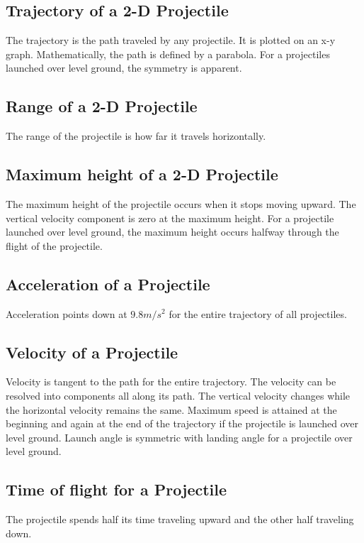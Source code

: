 \subsection{Trajectory of a 2-D Projectile}
The trajectory is the path traveled by any projectile. It is plotted on an x-y graph. Mathematically, the path is defined by a parabola. For a projectiles launched over level ground, the symmetry is apparent.
	
\subsection{Range of a 2-D Projectile}
The range of the projectile is how far it travels horizontally.
	
\subsection{Maximum height of a 2-D Projectile}
The maximum height of the projectile occurs when it stops moving upward. The vertical velocity component is zero at the maximum height. For a projectile launched over level ground, the maximum height occurs halfway through the flight of the projectile. 
	
\subsection{Acceleration of a Projectile}
Acceleration points down at $9.8m/s^2$ for the entire trajectory of all projectiles. 
	
\subsection{Velocity of a Projectile}
Velocity is tangent to the path for the entire trajectory. The velocity can be resolved into components all along its path. The vertical velocity changes while the horizontal velocity remains the same. Maximum speed is attained at the beginning and again at the end of the trajectory if the projectile is launched over level ground. Launch angle is symmetric with landing angle for a projectile over level ground.
	
\subsection{Time of flight for a Projectile}
The projectile spends half its time traveling upward and the other half traveling down.
	
